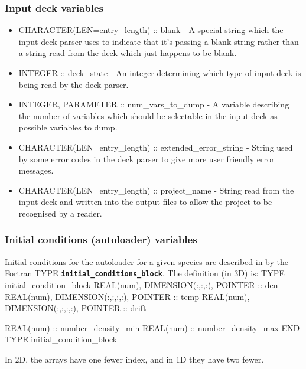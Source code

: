 \documentclass[12pt,a4paper]{article}
\newcommand{\inlinecode}[1]{{\color{warwickred} \bf\texttt{#1}}}
\newcommand{\EPOCH}{{\color{warwickdark}\fontfamily{phv}\selectfont{EPOCH}}}
\newenvironment{boxverbatim}{\lboxverbatim{none}}{\endlboxverbatim}
\begin{document}
\subsubsection{Input deck variables}
\begin{itemize}
\item CHARACTER(LEN=entry\_length) :: blank - A special string which the input
  deck parser uses to indicate that it's passing a blank string rather than a
  string read from the deck which just happens to be blank.
\item INTEGER :: deck\_state - An integer determining which type of input deck
  is being read by the deck parser.
\item INTEGER, PARAMETER :: num\_vars\_to\_dump - A variable describing the
  number of variables which should be selectable in the input deck as possible
  variables to dump.
\item CHARACTER(LEN=entry\_length) :: extended\_error\_string - String used by
  some error codes in the deck parser to give more user friendly error
  messages.
\item CHARACTER(LEN=entry\_length) :: project\_name - String read from the
  input deck and written into the output files to allow the project to be
  recognised by a reader.
\end{itemize}

\subsubsection{Initial conditions (autoloader) variables}
Initial conditions for the autoloader for a given species are described in
{\EPOCH} by the Fortran TYPE \inlinecode{initial\_conditions\_block}. The
definition (in 3D) is:
\begin{boxverbatim}
TYPE initial_condition_block
  REAL(num), DIMENSION(:,:,:), POINTER :: den
  REAL(num), DIMENSION(:,:,:,:), POINTER :: temp
  REAL(num), DIMENSION(:,:,:,:), POINTER :: drift

  REAL(num) :: number_density_min
  REAL(num) :: number_density_max
END TYPE initial_condition_block
\end{boxverbatim}

In 2D, the arrays have one fewer index, and in 1D they have two fewer.
\end{document}

